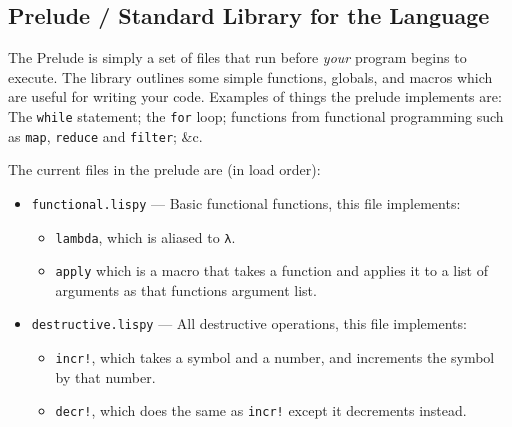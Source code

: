 \documentclass{article}
\newcommand{\code}[1]{\texttt{#1}}
\newcommand{\etc}{{\&}c.}
\begin{document}
    \clearpage

  \subsection{Prelude / Standard Library for the Language}
    The Prelude is simply a set of files that run before \emph{your} program
    begins to execute. The library outlines some simple functions, globals, and
    macros which are useful for writing your code. Examples of things the prelude
    implements are: The \code{while} statement; the \code{for} loop; functions
    from functional programming such as \code{map}, \code{reduce} and \code{filter};
    \etc

    The current files in the prelude are (in load order):
    \begin{itemize}
      \item \code{functional.lispy} --- Basic functional functions, this file implements:
        \begin{itemize}
          \item \code{lambda}, which is aliased to \code{λ}.
          \item \code{apply} which is a macro that takes a function
                and applies it to a list of arguments as that functions
                argument list.
        \end{itemize}
      \item \code{destructive.lispy} --- All destructive operations, this file implements:
        \begin{itemize}
          \item \code{incr!}, which takes a symbol and a number, and increments
                the symbol by that number.
          \item \code{decr!}, which does the same as \code{incr!} except it
                decrements instead.


\end{itemize}
\end{itemize}
\end{document}
